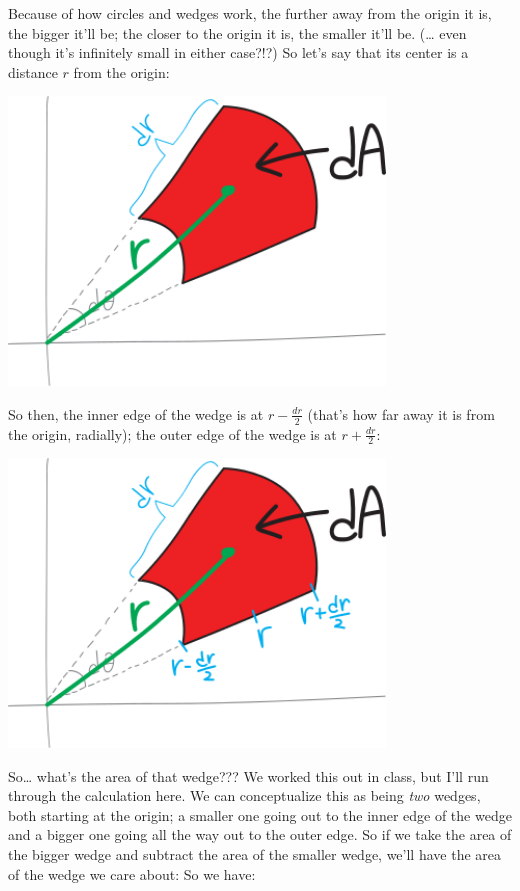 \documentclass[
]{article}
\begin{document}
Because of how circles and wedges work, the further away from the origin it is, the bigger it'll be; the closer to the origin it is, the smaller it'll be. (\ldots{} even though it's infinitely small in either case?!?) So let's say that its center is a distance \(r\) from the origin:

\includegraphics[width=0.75\textwidth,height=\textheight]{polar-differential-derivation-2.svg}

So then, the inner edge of the wedge is at \(r-\frac{dr}{2}\) (that's how far away it is from the origin, radially); the outer edge of the wedge is at \(r+ \frac{dr}{2}\):

\includegraphics[width=0.75\textwidth,height=\textheight]{polar-differential-derivation-3.svg}

So\ldots{} what's the area of that wedge??? We worked this out in class, but I'll run through the calculation here. We can conceptualize this as being \emph{two} wedges, both starting at the origin; a smaller one going out to the inner edge of the wedge and a bigger one going all the way out to the outer edge. So if we take the area of the bigger wedge and subtract the area of the smaller wedge, we'll have the area of the wedge we care about: So we have:
\end{document}
